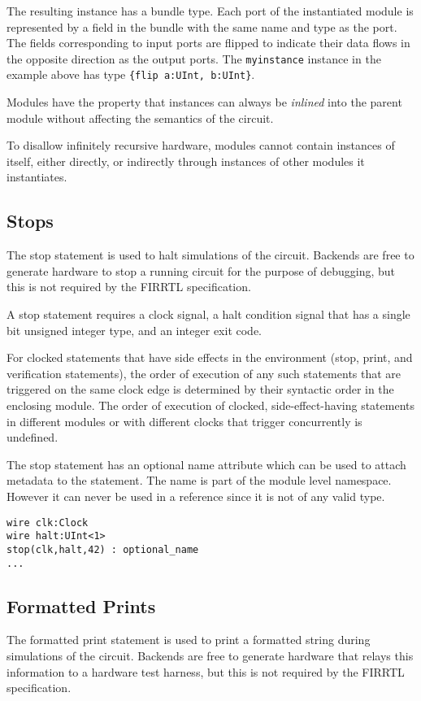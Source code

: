\documentclass[12pt]{article}
\begin{document}
The resulting instance has a bundle type. Each port of the instantiated module is represented by a field in the bundle with the same name and type as the port. The fields corresponding to input ports are flipped to indicate their data flows in the opposite direction as the output ports. The \verb|myinstance| instance in the example above has type \verb|{flip a:UInt, b:UInt}|.

Modules have the property that instances can always be {\em inlined} into the parent module without affecting the semantics of the circuit.

To disallow infinitely recursive hardware, modules cannot contain instances of itself, either directly, or indirectly through instances of other modules it instantiates.

\subsection{Stops} \label{stop_stmt}
The stop statement is used to halt simulations of the circuit. Backends are free to generate hardware to stop a running circuit for the purpose of debugging, but this is not required by the FIRRTL specification.

A stop statement requires a clock signal, a halt condition signal that has a single bit unsigned integer type, and an integer exit code.

For clocked statements that have side effects in the environment (stop, print, and verification
statements), the order of execution of any such statements that are triggered on the same clock edge
is determined by their syntactic order in the enclosing module. The order of execution of clocked,
side-effect-having statements in different modules or with different clocks that trigger
concurrently is undefined.

The stop statement has an optional name attribute which can be used to
attach metadata to the statement. The name is part of the module level
namespace. However it can never be used in a reference since it is not of
any valid type.

\begin{lstlisting}
wire clk:Clock
wire halt:UInt<1>
stop(clk,halt,42) : optional_name
...
\end{lstlisting}

\subsection{Formatted Prints}
The formatted print statement is used to print a formatted string during simulations of the circuit. Backends are free to generate hardware that relays this information to a hardware test harness, but this is not required by the FIRRTL specification.
\end{document}
